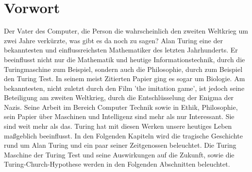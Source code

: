 \section{Vorwort}
Der Vater des Computer, die Person die wahrscheinlich den zweiten Weltkrieg um zwei Jahre verkürzte, was gibt es da noch zu sagen? Alan Turing eine der bekanntesten und einflussreichsten Mathematiker des letzten Jahrhunderts. Er beeinflusst nicht nur die Mathematik und heutige Informationstechnik, durch die Turingmaschine zum Beispiel, sondern auch die Philosophie, durch zum Beispiel den Turing Test. In seinem meist Zitierten Papier ging es sogar um Biologie. Am bekanntesten, nicht zuletzt durch den Film 'the imitation game', ist jedoch seine Beteiligung am zweiten Weltkrieg, durch die Entschlüsselung der Enigma der Nazis. Seine Arbeit im Bereich Computer Technik sowie in Ethik, Philosophie, sein Papier über Maschinen und Intelligenz sind mehr als nur Interessant. Sie sind weit mehr als das. Turing hat mit diesen Werken unsere heutiges Leben maßgeblich beeinflusst. In den Folgenden Kapiteln wird die tragische Geschichte rund um Alan Turing und ein paar seiner Zeitgenossen beleuchtet. Die Turing Maschine der Turing Test und seine Auswirkungen auf die Zukunft, sowie die Turing-Church-Hypothese werden in den Folgenden Abschnitten beleuchtet.